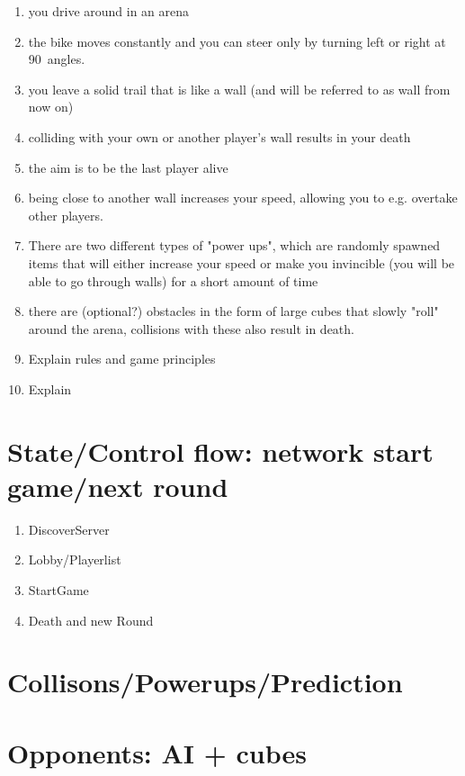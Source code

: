 \documentclass{report}
\begin{document}
\begin{enumerate}
  \item you drive around in an arena
  \item the bike moves constantly and you can steer only by turning left or right at 90\textdegree \ angles.
  \item you leave a solid trail that is like a wall (and will be referred to as wall from now on)
  \item colliding with your own or another player's wall results in your death
  \item the aim is to be the last player alive
  \item being close to another wall increases your speed, allowing you to e.g. overtake other players.
  \item There are two different types of "power ups", which are randomly spawned items that will either increase your speed or make you invincible (you will be able to go through walls) for a short amount of time
  \item there are (optional?) obstacles in the form of large cubes that slowly "roll" around the arena, collisions with these also result in death.

  
  \item Explain rules and game principles
  \item Explain 
\end{enumerate}



\section{State/Control flow: network start game/next round}

\begin{enumerate}
  \item DiscoverServer
  \item Lobby/Playerlist 
  \item StartGame
  \item Death and new Round
\end{enumerate}

\section{Collisons/Powerups/Prediction}

\section{ Opponents: AI + cubes}
\end{document}
